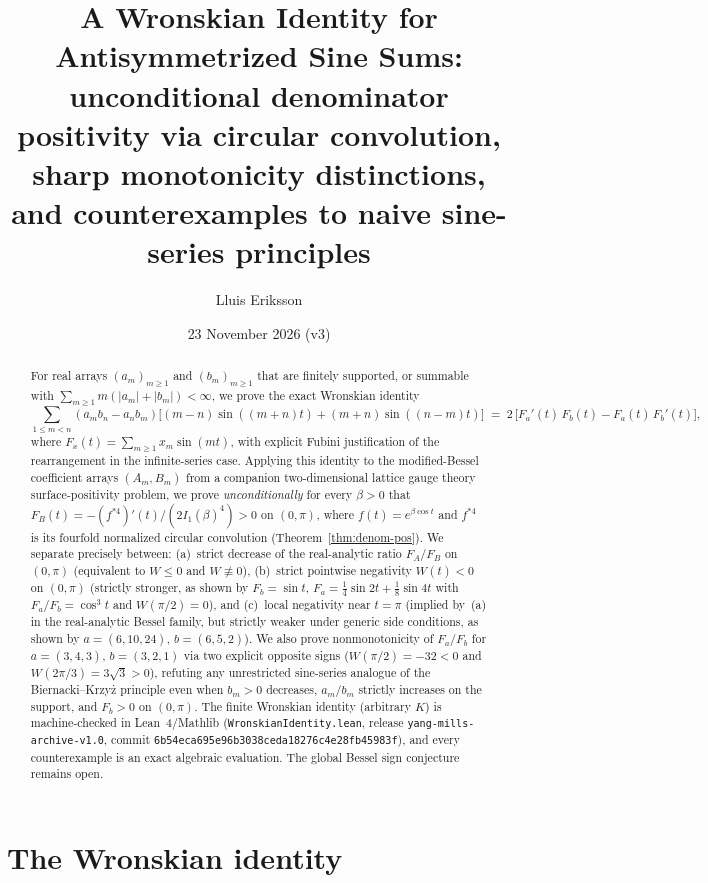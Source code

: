 \documentclass[11pt]{article}
\title{A Wronskian Identity for Antisymmetrized Sine Sums:\\
\large unconditional denominator positivity via circular convolution,\\
sharp monotonicity distinctions, and counterexamples to naive sine-series principles}
\author{Lluis Eriksson}
\date{23 November 2026 (v3)}
\theoremstyle{remark}
\begin{document}
\maketitle

\begin{abstract}
For real arrays $(a_m)_{m\ge 1}$ and $(b_m)_{m\ge 1}$ that are finitely supported, or
summable with $\sum_{m\ge 1} m(|a_m|+|b_m|) < \infty$, we prove the exact Wronskian identity
\[
\sum_{1 \le m < n} (a_m b_n - a_n b_m)
\bigl[(m-n)\sin((m+n)t) + (m+n)\sin((n-m)t)\bigr]
\;=\; 2\,\bigl[F_a'(t)\,F_b(t) - F_a(t)\,F_b'(t)\bigr],
\]
where $F_x(t) = \sum_{m\ge 1} x_m \sin(mt)$, with explicit Fubini justification of the
rearrangement in the infinite-series case. Applying this identity to the modified-Bessel
coefficient arrays $(A_m, B_m)$ from a companion two-dimensional lattice gauge theory
surface-positivity problem, we prove \emph{unconditionally} for every $\beta > 0$ that
$F_B(t) = -(f^{*4})'(t)/(2 I_1(\beta)^4) > 0$ on $(0,\pi)$, where $f(t)=e^{\beta\cos t}$
and $f^{*4}$ is its fourfold normalized circular convolution (Theorem~\ref{thm:denom-pos}).
We separate precisely between: (a)~strict decrease of the real-analytic ratio $F_A/F_B$ on
$(0,\pi)$ (equivalent to $W \le 0$ and $W \not\equiv 0$), (b)~strict pointwise negativity
$W(t) < 0$ on $(0,\pi)$ (strictly stronger, as shown by $F_b=\sin t$,
$F_a = \frac{1}{4}\sin 2t + \frac{1}{8}\sin 4t$ with $F_a/F_b = \cos^3 t$ and $W(\pi/2)=0$),
and (c)~local negativity near $t=\pi$ (implied by~(a) in the real-analytic Bessel family,
but strictly weaker under generic side conditions, as shown by $a=(6,10,24)$, $b=(6,5,2)$).
We also prove nonmonotonicity of $F_a/F_b$ for $a=(3,4,3)$, $b=(3,2,1)$ via two explicit
opposite signs ($W(\pi/2) = -32 < 0$ and $W(2\pi/3) = 3\sqrt{3} > 0$), refuting any
unrestricted sine-series analogue of the Biernacki--Krzy\.z principle even when $b_m > 0$
decreases, $a_m/b_m$ strictly increases on the support, and $F_b > 0$ on $(0,\pi)$. The
finite Wronskian identity (arbitrary $K$) is machine-checked in Lean~4/Mathlib
(\texttt{WronskianIdentity.lean}, release \texttt{yang-mills-archive-v1.0}, commit
\texttt{6b54eca695e96b3038ceda18276c4e28fb45983f}), and every counterexample is an exact
algebraic evaluation. The global Bessel sign conjecture remains open.
\end{abstract}

\section{The Wronskian identity}
\end{document}
